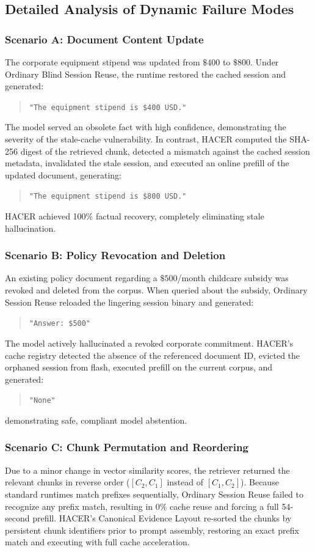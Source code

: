 \subsection{Detailed Analysis of Dynamic Failure Modes}

\subsubsection{Scenario A: Document Content Update}
The corporate equipment stipend was updated from $\$400$ to $\$800$. Under Ordinary Blind Session Reuse, the runtime restored the cached session and generated:
\begin{quote}
\small
\texttt{"The equipment stipend is \$400 USD."}
\end{quote}
The model served an obsolete fact with high confidence, demonstrating the severity of the stale-cache vulnerability. In contrast, HACER computed the SHA-256 digest of the retrieved chunk, detected a mismatch against the cached session metadata, invalidated the stale session, and executed an online prefill of the updated document, generating:
\begin{quote}
\small
\texttt{"The equipment stipend is \$800 USD."}
\end{quote}
HACER achieved 100\% factual recovery, completely eliminating stale hallucination.

\subsubsection{Scenario B: Policy Revocation and Deletion}
An existing policy document regarding a $\$500$/month childcare subsidy was revoked and deleted from the corpus. When queried about the subsidy, Ordinary Session Reuse reloaded the lingering session binary and generated:
\begin{quote}
\small
\texttt{"Answer: \$500"}
\end{quote}
The model actively hallucinated a revoked corporate commitment. HACER's cache registry detected the absence of the referenced document ID, evicted the orphaned session from flash, executed prefill on the current corpus, and generated:
\begin{quote}
\small
\texttt{"None"}
\end{quote}
demonstrating safe, compliant model abstention.

\subsubsection{Scenario C: Chunk Permutation and Reordering}
Due to a minor change in vector similarity scores, the retriever returned the relevant chunks in reverse order ($[C_2, C_1]$ instead of $[C_1, C_2]$). Because standard runtimes match prefixes sequentially, Ordinary Session Reuse failed to recognize any prefix match, resulting in $0\%$ cache reuse and forcing a full 54-second prefill. HACER's Canonical Evidence Layout re-sorted the chunks by persistent chunk identifiers prior to prompt assembly, restoring an exact prefix match and executing with full cache acceleration.

